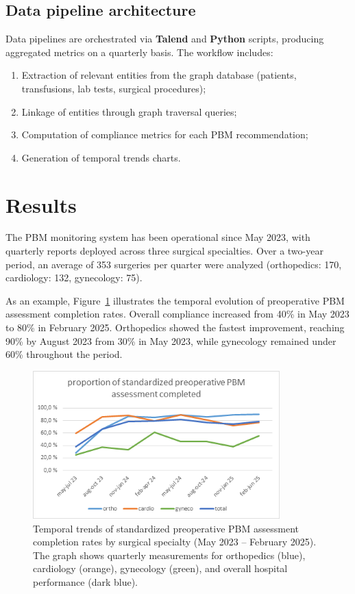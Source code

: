 \documentclass{IOS-Book-Article}
\begin{document}
\subsection{Data pipeline architecture}

Data pipelines are orchestrated via \textbf{Talend} and \textbf{Python} scripts, producing aggregated 
metrics on a quarterly basis. The workflow includes:

\begin{enumerate}
\item Extraction of relevant entities from the graph database (patients, transfusions, lab tests, surgical procedures);
\item Linkage of entities through graph traversal queries;
\item Computation of compliance metrics for each PBM recommendation;
\item Generation of temporal trends charts.
\end{enumerate}

\section{Results}

The PBM monitoring system has been operational since May 2023, with quarterly 
reports deployed across three surgical specialties. Over a two-year period, an 
average of 353 surgeries per quarter were analyzed (orthopedics: 170, 
cardiology: 132, gynecology: 75).

As an example, Figure~\ref{fig:pbm_trends} illustrates the temporal evolution of preoperative 
PBM assessment completion rates. Overall compliance increased from 40\% in May 
2023 to 80\% in February 2025. Orthopedics showed the fastest improvement, 
reaching 90\% by August 2023 from 30\% in May 2023, while gynecology remained under
60\% throughout the period.

\begin{figure}[h!]
\centering
\includegraphics[width=0.85\textwidth]{figure.png}
\caption{Temporal trends of standardized preoperative PBM assessment completion rates by surgical specialty (May 2023 -- February 2025). The graph shows quarterly measurements for orthopedics (blue), cardiology (orange), gynecology (green), and overall hospital performance (dark blue).}
\label{fig:pbm_trends}
\end{figure}
\end{document}
